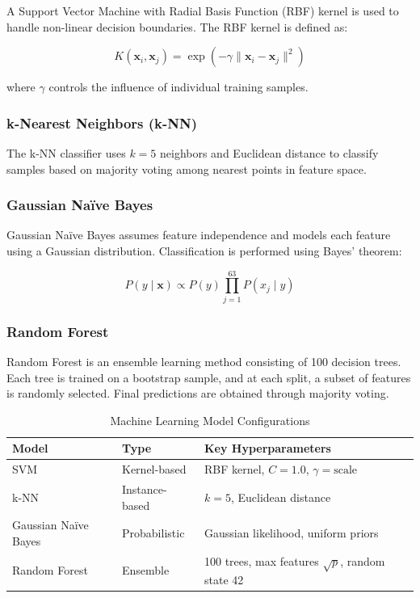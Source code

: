 A Support Vector Machine with Radial Basis Function (RBF) kernel is used to handle non-linear decision boundaries. The RBF kernel is defined as:

\[
K(\mathbf{x}_i, \mathbf{x}_j) = \exp(-\gamma \|\mathbf{x}_i - \mathbf{x}_j\|^2)
\]

where $\gamma$ controls the influence of individual training samples.

\subsubsection{k-Nearest Neighbors (k-NN)}

The k-NN classifier uses $k = 5$ neighbors and Euclidean distance to classify samples based on majority voting among nearest points in feature space.

\subsubsection{Gaussian Naïve Bayes}

Gaussian Naïve Bayes assumes feature independence and models each feature using a Gaussian distribution. Classification is performed using Bayes’ theorem:

\[
P(y \mid \mathbf{x}) \propto P(y) \prod_{j=1}^{63} P(x_j \mid y)
\]

\subsubsection{Random Forest}

Random Forest is an ensemble learning method consisting of 100 decision trees. Each tree is trained on a bootstrap sample, and at each split, a subset of features is randomly selected. Final predictions are obtained through majority voting.

\begin{table}[htbp]
\centering
\caption{Machine Learning Model Configurations}
\label{tab:models}
\renewcommand{\arraystretch}{1.2}

\begin{tabularx}{\linewidth}{L{3cm} L{3cm} L{6.3cm}}
\hline
\textbf{Model} & \textbf{Type} & \textbf{Key Hyperparameters} \\
\hline

SVM & Kernel-based & RBF kernel, $C = 1.0$, $\gamma = \text{scale}$ \\

k-NN & Instance-based & $k = 5$, Euclidean distance \\

Gaussian Naïve Bayes & Probabilistic & Gaussian likelihood, uniform priors \\

Random Forest & Ensemble & 100 trees, max features $\sqrt{p}$, random state 42 \\

\hline
\end{tabularx}
\end{table}

